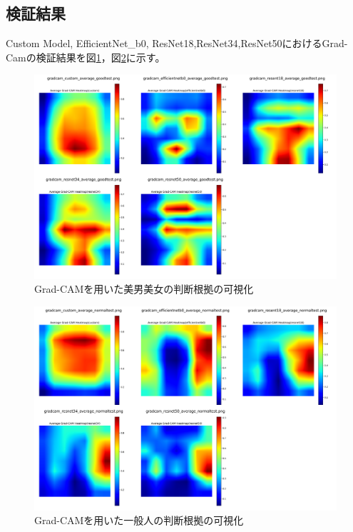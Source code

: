 \documentclass[a4paper,11pt,titlepage]{jsarticle}
\begin{document}
\subsection{検証結果}
Custom Model, EfficientNet\_b0, ResNet18,ResNet34,ResNet50におけるGrad-Camの検証結果を図\ref{fig:gradcam_good}，図\ref{fig:gradcam_normal}に示す。
\begin{figure}[H]
    \centering
    \includegraphics[width=1.1\textwidth]{combined_images_good.png}
    \caption{Grad-CAMを用いた美男美女の判断根拠の可視化}
    \label{fig:gradcam_good}
\end{figure}
\begin{figure}[H]
    \centering
    \includegraphics[width=1.1\textwidth]{combined_images_normal.png}
    \caption{Grad-CAMを用いた一般人の判断根拠の可視化}
    \label{fig:gradcam_normal}
\end{figure}
\end{document}
